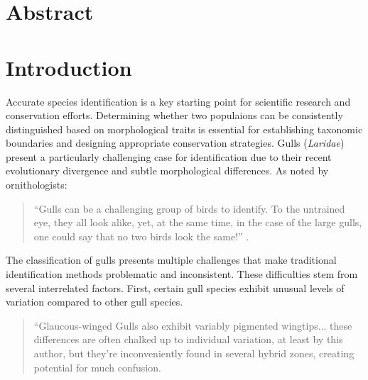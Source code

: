 \documentclass[a4paper,12pt]{article}
\begin{document}
\newpage
\section*{\centering \normalsize{Abstract}}


\newpage
\tableofcontents

\newpage
\listoffigures

\newpage
\listoftables

\newpage
\cleardoublepage %
\setcounter{page}{1} %

\section{Introduction}
Accurate species identification is a key starting point for scientific research and conservation efforts. Determining whether two populaions can be consistently distinguished based on morphological traits is essential for establishing taxonomic boundaries and designing appropriate conservation strategies. Gulls (\textit{Laridae}) present a particularly challenging case for identification due to their recent evolutionary divergence and subtle morphological differences. As noted by ornithologists:

\begin{quote}
    ``Gulls can be a challenging group of birds to identify. To the untrained eye, they all look alike, yet, at the same time, in the case of the large gulls, one could say that no two birds look the same!'' \citep{ayyash2024}.
\end{quote}


The classification of gulls presents multiple challenges that make traditional identification methods problematic and inconsistent. These difficulties stem from several interrelated factors. First, certain gull species exhibit unusual levels of variation compared to other gull species.

\begin{quote}
``Glaucous-winged Gulls also exhibit variably pigmented wingtips... these differences are often chalked up to individual
variation, at least by this author, but they're inconveniently found in several hybrid zones, creating potential for much
confusion.\citep{adriaens2022}
\end{quote}
\end{document}
